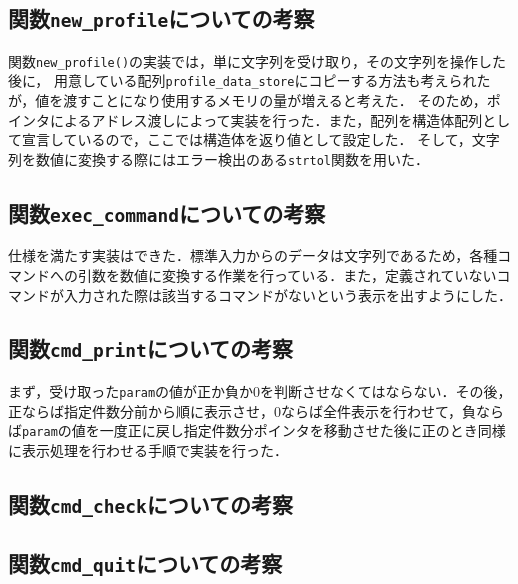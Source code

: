 \documentclass[a4j,11pt]{jarticle}
\begin{document}
\subsection{関数\texttt{new\_profile}についての考察}
関数\verb|new_profile()|の実装では，単に文字列を受け取り，その文字列を操作した後に，
用意している配列\verb|profile_data_store|にコピーする方法も考えられたが，値を渡すことになり使用するメモリの量が増えると考えた．
そのため，ポインタによるアドレス渡しによって実装を行った．また，配列を構造体配列として宣言しているので，ここでは構造体を返り値として設定した．
そして，文字列を数値に変換する際にはエラー検出のある\verb|strtol|関数を用いた．
\subsection{関数\texttt{exec\_command}についての考察}
仕様を満たす実装はできた．標準入力からのデータは文字列であるため，各種コマンドへの引数を数値に変換する作業を行っている．また，定義されていないコマンドが入力された際は該当するコマンドがないという表示を出すようにした．

\subsection{関数\texttt{cmd\_print}についての考察}
まず，受け取った\verb|param|の値が正か負か$0$を判断させなくてはならない．その後，正ならば指定件数分前から順に表示させ，$0$ならば全件表示を行わせて，負ならば\verb|param|の値を一度正に戻し指定件数分ポインタを移動させた後に正のとき同様に表示処理を行わせる手順で実装を行った．

\subsection{関数\texttt{cmd\_check}についての考察}
\subsection{関数\texttt{cmd\_quit}についての考察}
\end{document}
